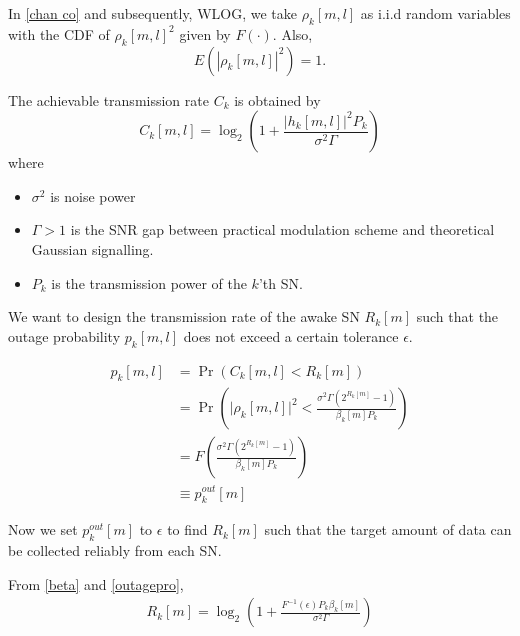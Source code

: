 \documentclass{beamer}
\providecommand{\pr}[1]{\ensuremath{\Pr\left(#1\right)}}
\providecommand{\brak}[1]{\ensuremath{\left(#1\right)}}
\providecommand{\abs}[1]{\vert#1\vert}
\begin{document}
\begin{frame}
In \eqref{chan co} and subsequently, WLOG, we take $\rho_k[m,l]$ as i.i.d random variables with the CDF of $\rho_k[m,l]^2$ given by $F\brak{\cdot}$. Also,
\begin{equation}
    E\brak{|\rho_k[m,l]|^2}=1.
\end{equation}
\begin{block}{}
The achievable transmission rate $C_k$ is obtained by
\begin{equation}
    C_k[m,l]=\log_2\brak{1+\frac{|h_k[m,l]|^2 P_k}{\sigma^2 \Gamma}}\label{Ck}
\end{equation}
where 
\begin{itemize}
    \item $\sigma^2$ is noise power
    \item$\Gamma>1$ is the SNR gap between practical modulation scheme and theoretical Gaussian signalling.
    \item $P_k$ is the transmission power of the $k$'th SN.
\end{itemize}
\end{block}
\end{frame}
\begin{frame}
We want to design the transmission rate of the awake SN $R_k[m]$ such that the outage probability $p_k[m,l]$ does not exceed a certain tolerance $\epsilon$.

\begin{align}
    p_k[m,l]&=\pr{C_k[m,l]<R_k[m]}\\\label{outagepro}
    &=\pr{\abs{\rho_k[m, l]}^2 <\frac{\sigma^2\Gamma \brak{2^{R_k[m]}-1}}{\beta_k[m]P_k}}\\
    &=F\brak{\frac{\sigma^2\Gamma \brak{2^{R_k[m]}-1}}{\beta_k[m]P_k}}\\
    &\equiv p_k^{out}[m]
\end{align}
\begin{block}{}
Now we set $p_k^{out}[m]$ to $\epsilon$ to find $R_k[m]$ such that the target amount of data can be collected reliably from each SN. 
     
 From \eqref{beta} and \eqref{outagepro}, 
\begin{align}
R_k[m]=\log_2\brak{1+\frac{F^{-1}\brak{\epsilon}P_k \beta_k[m]}{\sigma^2\Gamma}}
\end{align}
\end{block}
\end{frame}
\end{document}
